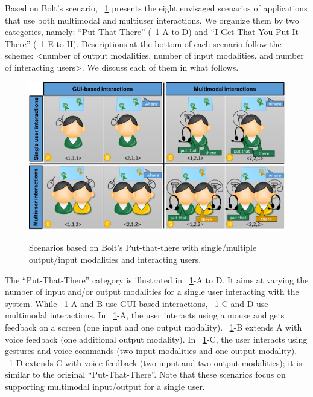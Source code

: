 \documentclass[
  doutorado,
  american
]{ThesisPUC}
\newcommand{\fig}[1]{\figurename~\ref{#1}}
\newcommand{\captionvspace}{\vspace{-1.3em}}
\begin{document}
Based on Bolt’s scenario, \fig{fig:scenarios} presents the eight envisaged
scenarios of applications that use both multimodal and multiuser interactions.
We organize them by two categories, namely: “Put-That-There”
(\fig{fig:scenarios}-A to D) and “I-Get-That-You-Put-It-There”
(\fig{fig:scenarios}-E to H). Descriptions at the bottom of each scenario follow
the scheme: <number of output modalities, number of input modalities, and number
of interacting users>. We discuss each of them in what follows.

\begin{figure}[!ht]
\begin{center}
    \includegraphics[width=12cm, keepaspectratio]{img/img3.png}
	\caption [Scenarios based on Bolt's Put-that-there]{Scenarios based on
		Bolt's Put-that-there with single/multiple output/input modalities and
		interacting users.}
    \captionvspace
	\label{fig:scenarios}
\end{center}
\end{figure}

The “Put-That-There” category is illustrated in \fig{fig:scenarios}-A to D. It
aims at varying the number of input and/or output modalities for a single user
interacting with the system. While \fig{fig:scenarios}-A and B use GUI-based
interactions, \fig{fig:scenarios}-C and D use multimodal interactions. In 
\fig{fig:scenarios}-A, the user interacts using a mouse and gets feedback on a
screen (one input and one output modality). \fig{fig:scenarios}-B extends A with
voice feedback (one additional output modality). In \fig{fig:scenarios}-C, the
user interacts using gestures and voice commands (two input modalities and one
output modality). \fig{fig:scenarios}-D extends C with voice feedback (two input
and two output modalities); it is similar to the original “Put-That-There”. Note
that these scenarios focus on supporting multimodal input/output for a single
user.
\end{document}
